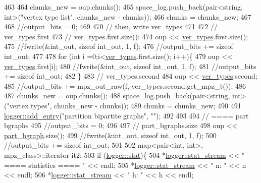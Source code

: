 \begin{DoxyCode}
463 
464   chunks\_new = oup.chunks();
465   space\_log.push\_back(pair<string, int>(\textcolor{stringliteral}{"vertex type list"}, chunks\_new - chunks));
466   chunks = chunks\_new;
467 
468   \textcolor{comment}{//output\_bits = 0;}
469   
470   \textcolor{comment}{// then, write ver\_types}
471 
472   \textcolor{comment}{// ver\_types.first}
473   \textcolor{comment}{// ver\_types.first.size():}
474   oup << \hyperlink{classmarked__graph__compressed_af446cc5e23c241a92b76642fd5ebc403}{ver\_types}.first.size();
475   \textcolor{comment}{//fwrite(&int\_out, sizeof int\_out, 1, f);}
476   \textcolor{comment}{//output\_bits += sizeof int\_out;}
477 
478   \textcolor{keywordflow}{for} (\textcolor{keywordtype}{int} i =0;i<\hyperlink{classmarked__graph__compressed_af446cc5e23c241a92b76642fd5ebc403}{ver\_types}.first.size(); i++)\{
479     oup <<  \hyperlink{classmarked__graph__compressed_af446cc5e23c241a92b76642fd5ebc403}{ver\_types}.first[i];
480     \textcolor{comment}{//fwrite(&int\_out, sizeof int\_out, 1, f);}
481     \textcolor{comment}{//output\_bits += sizeof int\_out;}
482   \}
483   \textcolor{comment}{// ver\_types.second}
484   oup << \hyperlink{classmarked__graph__compressed_af446cc5e23c241a92b76642fd5ebc403}{ver\_types}.second;
485   \textcolor{comment}{//output\_bits += mpz\_out\_raw(f, ver\_types.second.get\_mpz\_t());}
486 
487   chunks\_new = oup.chunks();
488   space\_log.push\_back(pair<string, int> (\textcolor{stringliteral}{"vertex types"}, chunks\_new - chunks));
489   chunks = chunks\_new;
490 
491   \hyperlink{classlogger_a710163deb17bc81f70d53d285b8ac9ac}{logger::add\_entry}(\textcolor{stringliteral}{"partition bipartite graphs"}, \textcolor{stringliteral}{""});
492   
493 
494   \textcolor{comment}{// ==== part bgraphs}
495   \textcolor{comment}{//output\_bits = 0;}
496 
497   \textcolor{comment}{// part\_bgraphs.size}
498   oup << \hyperlink{classmarked__graph__compressed_a7b3267063fba30b45eb21b3ba4e07536}{part\_bgraph}.size();
499   \textcolor{comment}{//fwrite(&int\_out, sizeof int\_out, 1, f);}
500   \textcolor{comment}{//output\_bits += sizeof int\_out;}
501 
502   map<pair<int, int>, mpz\_class>::iterator it2;
503   \textcolor{keywordflow}{if} (\hyperlink{classlogger_a26812b5ba03f130e8dae3446d5fc032f}{logger::stat})\{
504     *\hyperlink{classlogger_a7db37821f875f2ba3540980b355779f5}{logger::stat\_stream} << \textcolor{stringliteral}{" ==== statistics ==== "} << endl;
505     *\hyperlink{classlogger_a7db37821f875f2ba3540980b355779f5}{logger::stat\_stream} << \textcolor{stringliteral}{" n:                "} << n << endl;
506     *\hyperlink{classlogger_a7db37821f875f2ba3540980b355779f5}{logger::stat\_stream} << \textcolor{stringliteral}{" h:                "} << h << endl;

\end{DoxyCode}
